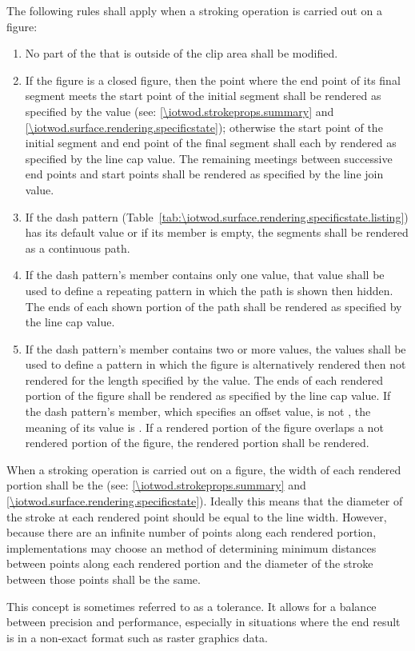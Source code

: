 \pnum
The following rules shall apply when a stroking operation is carried out on a figure:
\begin{enumerate}
\item No part of the \underlyingsurface that is outside of the clip area shall be modified.

\item If the figure is a closed figure, then the point where the end point of its final segment meets the start point of the initial segment shall be rendered as specified by the  value (see: \ref{\iotwod.strokeprops.summary} and \ref{\iotwod.surface.rendering.specificstate}); otherwise the start point of the initial segment and end point of the final segment shall each by rendered as specified by the line cap value. The remaining meetings between successive end points and start points shall be rendered as specified by the line join value.

\item If the dash pattern (Table~\ref{tab:\iotwod.surface.rendering.specificstate.listing}) has its default value or if its  member is empty, the segments shall be rendered as a continuous path.

\item If the dash pattern's  member contains only one value, that value shall be used to define a repeating pattern in which the path is shown then hidden. The ends of each shown portion of the path shall be rendered as specified by the line cap value.

\item If the dash pattern's  member contains two or more values, the values shall be used to define a pattern in which the figure is alternatively rendered then not rendered for the length specified by the value. The ends of each rendered portion of the figure shall be rendered as specified by the line cap value. If the dash pattern's  member, which specifies an offset value, is not , the meaning of its value is . If a rendered portion of the figure overlaps a not rendered portion of the figure, the rendered portion shall be rendered.
\end{enumerate}

\pnum
When a stroking operation is carried out on a figure, the width of each rendered portion shall be the  (see: \ref{\iotwod.strokeprops.summary} and \ref{\iotwod.surface.rendering.specificstate}). Ideally this means that the diameter of the stroke at each rendered point should be equal to the line width. However, because there are an infinite number of points along each rendered portion, implementations may choose an \unspecnorm method of determining minimum distances between points along each rendered portion and the diameter of the stroke between those points shall be the same.
\begin{note}
This concept is sometimes referred to as a tolerance. It allows for a balance between precision and performance, especially in situations where the end result is in a non-exact format such as raster graphics data.
\end{note}

